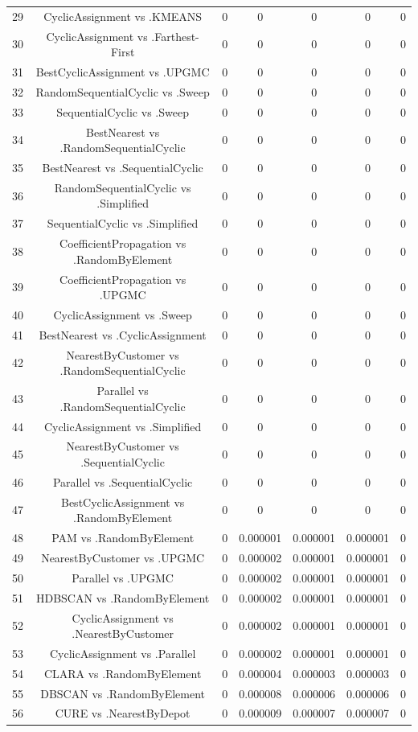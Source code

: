 \documentclass[a4paper,10pt]{article}
\begin{document}
\begin{landscape}
\begin{table}[!htp]
\begin{tabular}{ccccccc}
29&CyclicAssignment vs .KMEANS&0&0&0&0&0\\
30&CyclicAssignment vs .Farthest-First&0&0&0&0&0\\
31&BestCyclicAssignment vs .UPGMC&0&0&0&0&0\\
32&RandomSequentialCyclic vs .Sweep&0&0&0&0&0\\
33&SequentialCyclic vs .Sweep&0&0&0&0&0\\
34&BestNearest vs .RandomSequentialCyclic&0&0&0&0&0\\
35&BestNearest vs .SequentialCyclic&0&0&0&0&0\\
36&RandomSequentialCyclic vs .Simplified&0&0&0&0&0\\
37&SequentialCyclic vs .Simplified&0&0&0&0&0\\
38&CoefficientPropagation vs .RandomByElement&0&0&0&0&0\\
39&CoefficientPropagation vs .UPGMC&0&0&0&0&0\\
40&CyclicAssignment vs .Sweep&0&0&0&0&0\\
41&BestNearest vs .CyclicAssignment&0&0&0&0&0\\
42&NearestByCustomer vs .RandomSequentialCyclic&0&0&0&0&0\\
43&Parallel vs .RandomSequentialCyclic&0&0&0&0&0\\
44&CyclicAssignment vs .Simplified&0&0&0&0&0\\
45&NearestByCustomer vs .SequentialCyclic&0&0&0&0&0\\
46&Parallel vs .SequentialCyclic&0&0&0&0&0\\
47&BestCyclicAssignment vs .RandomByElement&0&0&0&0&0\\
48&PAM vs .RandomByElement&0&0.000001&0.000001&0.000001&0\\
49&NearestByCustomer vs .UPGMC&0&0.000002&0.000001&0.000001&0\\
50&Parallel vs .UPGMC&0&0.000002&0.000001&0.000001&0\\
51&HDBSCAN vs .RandomByElement&0&0.000002&0.000001&0.000001&0\\
52&CyclicAssignment vs .NearestByCustomer&0&0.000002&0.000001&0.000001&0\\
53&CyclicAssignment vs .Parallel&0&0.000002&0.000001&0.000001&0\\
54&CLARA vs .RandomByElement&0&0.000004&0.000003&0.000003&0\\
55&DBSCAN vs .RandomByElement&0&0.000008&0.000006&0.000006&0\\
56&CURE vs .NearestByDepot&0&0.000009&0.000007&0.000007&0\\

\end{tabular}
\end{table}
\end{landscape}
\end{document}
